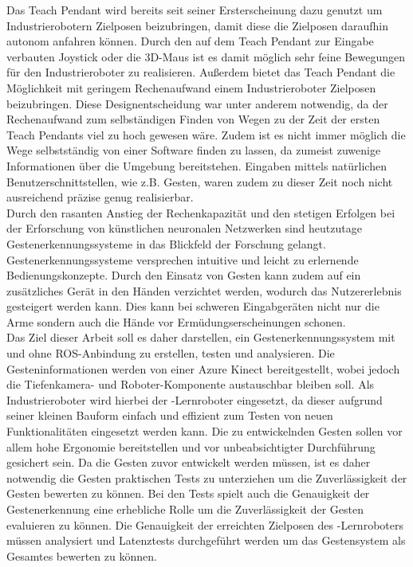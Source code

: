 Das Teach Pendant wird bereits seit seiner Ersterscheinung dazu genutzt um Industrierobotern Zielposen beizubringen, damit diese die Zielposen daraufhin autonom anfahren können. Durch den auf dem Teach Pendant zur Eingabe verbauten Joystick oder die 3D-Maus ist es damit möglich sehr feine Bewegungen für den Industrieroboter zu realisieren. Außerdem bietet das Teach Pendant die Möglichkeit mit geringem Rechenaufwand einem Industrieroboter Zielposen beizubringen. Diese Designentscheidung war unter anderem notwendig, da der Rechenaufwand zum selbständigen Finden von Wegen zu der Zeit der ersten Teach Pendants viel zu hoch gewesen wäre. Zudem ist es nicht immer möglich die Wege selbstständig von einer Software finden zu lassen, da zumeist zuwenige Informationen über die Umgebung bereitstehen. Eingaben mittels natürlichen Benutzerschnittstellen, wie z.B. Gesten, waren zudem zu dieser Zeit noch nicht ausreichend präzise genug realisierbar.\\

Durch den rasanten Anstieg der Rechenkapazität und den stetigen Erfolgen bei der Erforschung von künstlichen neuronalen Netzwerken sind heutzutage Gestenerkennungssysteme in das Blickfeld der Forschung gelangt. Gestenerkennungssysteme versprechen intuitive und leicht zu erlernende Bedienungskonzepte. Durch den Einsatz von Gesten kann zudem auf ein zusätzliches Gerät in den Händen verzichtet werden, wodurch das Nutzererlebnis gesteigert werden kann. Dies kann bei schweren Eingabgeräten nicht nur die Arme sondern auch die Hände vor Ermüdungserscheinungen schonen.\\

Das Ziel dieser Arbeit soll es daher darstellen, ein Gestenerkennungssystem mit und ohne ROS-Anbindung zu erstellen, testen und analysieren. Die Gesteninformationen werden von einer Azure Kinect bereitgestellt, wobei jedoch die Tiefenkamera- und Roboter-Komponente austauschbar bleiben soll. Als Industrieroboter wird hierbei der -Lernroboter eingesetzt, da dieser aufgrund seiner kleinen Bauform einfach und effizient zum Testen von neuen Funktionalitäten eingesetzt werden kann. Die zu entwickelnden Gesten sollen vor allem hohe Ergonomie bereitstellen und vor unbeabsichtigter Durchführung gesichert sein. Da die Gesten zuvor entwickelt werden müssen, ist es daher notwendig die Gesten praktischen Tests zu unterziehen um die Zuverlässigkeit der Gesten bewerten zu können. Bei den Tests spielt auch die Genauigkeit der Gestenerkennung eine erhebliche Rolle um die Zuverlässigkeit der Gesten evaluieren zu können. Die Genauigkeit der erreichten Zielposen des -Lernroboters müssen analysiert und Latenztests durchgeführt werden um das Gestensystem als Gesamtes bewerten zu können.
